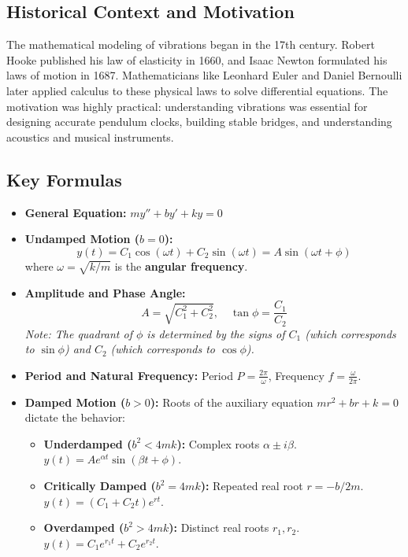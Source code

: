 \documentclass[11pt]{article}
\begin{document}
\subsection{Historical Context and Motivation}
The mathematical modeling of vibrations began in the 17th century. Robert Hooke published his law of elasticity in 1660, and Isaac Newton formulated his laws of motion in 1687. Mathematicians like Leonhard Euler and Daniel Bernoulli later applied calculus to these physical laws to solve differential equations. The motivation was highly practical: understanding vibrations was essential for designing accurate pendulum clocks, building stable bridges, and understanding acoustics and musical instruments.

\subsection{Key Formulas}
\begin{itemize}
    \item \textbf{General Equation:} $my'' + by' + ky = 0$
    \item \textbf{Undamped Motion ($b = 0$):} 
    \[ y(t) = C_1 \cos(\omega t) + C_2 \sin(\omega t) = A \sin(\omega t + \phi) \]
    where $\omega = \sqrt{k/m}$ is the \textbf{angular frequency}.
    \item \textbf{Amplitude and Phase Angle:} 
    \[ A = \sqrt{C_1^2 + C_2^2}, \quad \tan \phi = \frac{C_1}{C_2} \]
    \textit{Note: The quadrant of $\phi$ is determined by the signs of $C_1$ (which corresponds to $\sin \phi$) and $C_2$ (which corresponds to $\cos \phi$).}
    \item \textbf{Period and Natural Frequency:} Period $P = \frac{2\pi}{\omega}$, Frequency $f = \frac{\omega}{2\pi}$.
    \item \textbf{Damped Motion ($b > 0$):} Roots of the auxiliary equation $mr^2 + br + k = 0$ dictate the behavior:
    \begin{itemize}
        \item \textbf{Underdamped ($b^2 < 4mk$):} Complex roots $\alpha \pm i\beta$. $y(t) = A e^{\alpha t} \sin(\beta t + \phi)$.
        \item \textbf{Critically Damped ($b^2 = 4mk$):} Repeated real root $r = -b/2m$. $y(t) = (C_1 + C_2 t)e^{rt}$.
        \item \textbf{Overdamped ($b^2 > 4mk$):} Distinct real roots $r_1, r_2$. $y(t) = C_1 e^{r_1 t} + C_2 e^{r_2 t}$.
    \end{itemize}
\end{itemize}
\end{document}
